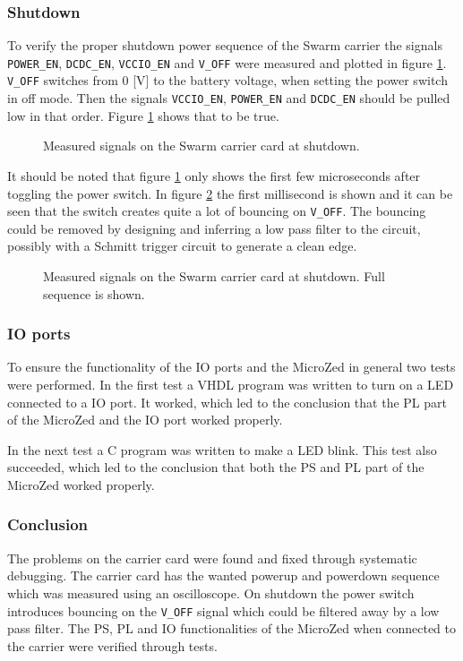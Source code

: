 \subsubsection*{Shutdown}
To verify the proper shutdown power sequence of the Swarm carrier the signals \texttt{POWER\_EN}, \texttt{DCDC\_EN}, \texttt{VCCIO\_EN} and \texttt{V\_OFF} were measured and plotted in figure \ref{fig:shutdown}.
\texttt{V\_OFF} switches from 0 [V] to the battery voltage, when setting the power switch in off mode.
Then the signals \texttt{VCCIO\_EN}, \texttt{POWER\_EN} and \texttt{DCDC\_EN} should be pulled low in that order.
Figure \ref{fig:shutdown} shows that to be true.

\begin{figure}
	\centering
    
	\caption{Measured signals on the Swarm carrier card at shutdown.}
	\label{fig:shutdown}
\end{figure}
It should be noted that figure \ref{fig:shutdown} only shows the first few microseconds after toggling the power switch.
In figure \ref{fig:shutdown_bounce} the first millisecond is shown and it can be seen that the switch creates quite a lot of bouncing on \texttt{V\_OFF}.
The bouncing could be removed by designing and inferring a low pass filter to the circuit, possibly with a Schmitt trigger circuit to generate a clean edge.

\begin{figure}
	\centering
    
	\caption{Measured signals on the Swarm carrier card at shutdown. Full sequence is shown.}
	\label{fig:shutdown_bounce}
\end{figure}

\subsubsection*{IO ports}
To ensure the functionality of the IO ports and the MicroZed in general two tests were performed.
In the first test a VHDL program was written to turn on a LED connected to a IO port. 
It worked, which led to the conclusion that the PL part of the MicroZed and the IO port worked properly.

In the next test a C program was written to make a LED blink.
This test also succeeded, which led to the conclusion that both the PS and PL part of the MicroZed worked properly.

\subsubsection*{Conclusion}
The problems on the carrier card were found and fixed through systematic debugging.
The carrier card has the wanted powerup and powerdown sequence which was measured using an oscilloscope. 
On shutdown the power switch introduces bouncing on the \texttt{V\_OFF} signal which could be filtered away by a low pass filter.
The PS, PL and IO functionalities of the MicroZed when connected to the carrier were verified through tests.
